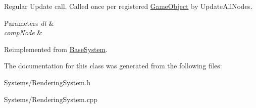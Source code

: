 Regular Update call. Called once per registered \hyperlink{classGameObject}{Game\+Object} by Update\+All\+Nodes. 


\begin{DoxyParams}{Parameters}
{\em dt} & \\
\hline
{\em comp\+Node} & \\
\hline
\end{DoxyParams}


Reimplemented from \hyperlink{classBaseSystem_a465191589a1ef8b8f3a8e20fa4656d47}{Base\+System}.



The documentation for this class was generated from the following files\+:\begin{DoxyCompactItemize}
\item 
Systems/Rendering\+System.\+h\item 
Systems/Rendering\+System.\+cpp\end{DoxyCompactItemize}
